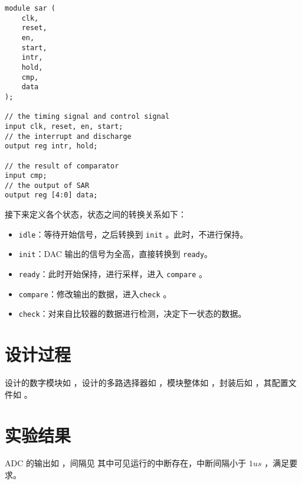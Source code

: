 \documentclass[lang=cn,11pt,a4paper,cite=authoryear]{elegantpaper}
\begin{document}
\begin{lstlisting}
module sar (
    clk,
    reset,
    en,
    start,
    intr,
    hold,
    cmp,
    data
);

// the timing signal and control signal 
input clk, reset, en, start;
// the interrupt and discharge 
output reg intr, hold;

// the result of comparator 
input cmp;
// the output of SAR 
output reg [4:0] data;
\end{lstlisting}

接下来定义各个状态，状态之间的转换关系如下：

\begin{itemize}
    \item \lstinline{idle}：等待开始信号，之后转换到 \lstinline{init} 。此时，不进行保持。
    \item \lstinline{init}：DAC 输出的信号为全高，直接转换到 \lstinline{ready}。
    \item \lstinline{ready}：此时开始保持，进行采样，进入 \lstinline{compare} 。
    \item \lstinline{compare}：修改输出的数据，进入\lstinline{check} 。
    \item \lstinline{check}：对来自比较器的数据进行检测，决定下一状态的数据。
\end{itemize}

\section{设计过程}

设计的数字模块如  ，设计的多路选择器如 ，模块整体如  ，封装后如 ，其配置文件如  。






\section{实验结果}

ADC 的输出如  ，间隔见  其中可见运行的中断存在，中断间隔小于 \(1 us\) ，满足要求。



\end{document}
